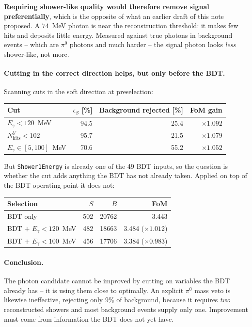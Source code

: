 \documentclass[11pt,a4paper]{article}
\begin{document}
\textbf{Requiring shower-like quality would therefore remove signal
preferentially}, which is the opposite of what an earlier draft of this note
proposed. A $74$~MeV photon is near the reconstruction threshold: it makes few
hits and deposits little energy. Measured against true photons in background
events -- which are $\pi^0$ photons and much harder -- the signal photon looks
\emph{less} shower-like, not more.

\paragraph{Cutting in the correct direction helps, but only before the BDT.}
Scanning cuts in the soft direction at preselection:

\begin{center}
\begin{tabular}{lrrr}
\toprule
Cut & $\epsilon_S$ [\%] & Background rejected [\%] & FoM gain \\
\midrule
$E_\gamma < 120$~MeV          & 94.5 & 25.4 & $\times1.092$ \\
$N_{\mathrm{hits}}^{Y} < 102$ & 95.7 & 21.5 & $\times1.079$ \\
$E_\gamma \in [5,100]$~MeV    & 70.6 & 55.2 & $\times1.052$ \\
\bottomrule
\end{tabular}
\end{center}

\noindent But \texttt{Shower1Energy} is already one of the 49 BDT inputs, so the
question is whether the cut adds anything the BDT has not already taken. Applied on
top of the BDT operating point it does not:

\begin{center}
\begin{tabular}{lrrr}
\toprule
Selection & $S$ & $B$ & FoM \\
\midrule
BDT only                            & 502 & 20762 & 3.443 \\
BDT $+$ $E_\gamma<120$~MeV          & 482 & 18663 & 3.484 \quad($\times1.012$) \\
BDT $+$ $E_\gamma<100$~MeV          & 456 & 17706 & 3.384 \quad($\times0.983$) \\
\bottomrule
\end{tabular}
\end{center}

\paragraph{Conclusion.} The photon candidate cannot be improved by cutting on
variables the BDT already has -- it is using them close to optimally. An explicit
$\pi^0$ mass veto is likewise ineffective, rejecting only $9\%$ of background,
because it requires \emph{two} reconstructed showers and most background events
supply only one. Improvement must come from information the BDT does not yet have.
\end{document}

